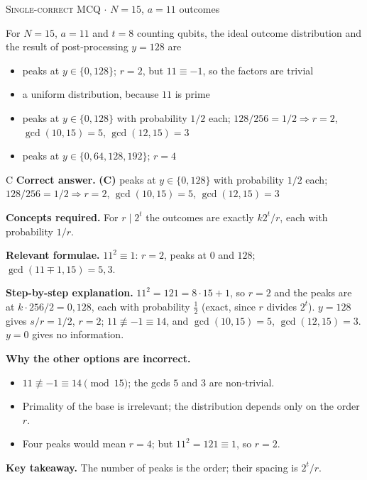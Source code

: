 \documentclass[11pt,a4paper]{article}
\newcommand{\optlabel}[1]{\textbf{(#1)}}
\newcommand{\correctlabel}[1]{\textcolor{okgreen}{\textbf{(#1)}\,\ding{51}}}
\newenvironment{qitem}[1]{\begin{list}{}{\setlength{\leftmargin}{3.3em}\setlength{\labelwidth}{3.1em}%
  \setlength{\labelsep}{0.2em}\setlength{\topsep}{3pt}\setlength{\parsep}{3pt}}\item[\textbf{Q.#1}\hfill]}{\end{list}}
\newcommand{\qsep}{\par\vspace{2pt}{\color{black!15}\hrule}\vspace{4pt}}
\newcommand{\qmeta}[2]{{\footnotesize\color{black!60}\textsc{#1} \;$\cdot$\; #2}\par}
\begin{document}
\begin{qitem}{47}
\qmeta{Single-correct MCQ}{$N = 15$, $a = 11$ outcomes}
For $N = 15$, $a = 11$ and $t = 8$ counting qubits, the ideal outcome distribution and the result of post-processing $y = 128$ are
\begin{itemize}[leftmargin=2.6em, labelsep=0.4em, itemsep=2pt, topsep=3pt]
\item[\optlabel{A}] peaks at $y \in \{0, 128\}$; $r = 2$, but $11 \equiv -1$, so the factors are trivial
\item[\optlabel{B}] a uniform distribution, because $11$ is prime
\item[\correctlabel{C}] peaks at $y \in \{0, 128\}$ with probability $1/2$ each; $128/256 = 1/2 \Rightarrow r = 2$, $\gcd(10, 15) = 5$, $\gcd(12, 15) = 3$
\item[\optlabel{D}] peaks at $y \in \{0, 64, 128, 192\}$; $r = 4$
\end{itemize}
\end{qitem}
\begin{solbox}{C}
\textbf{\color{brand}Correct answer.} \textcolor{okgreen}{\textbf{(C)}} peaks at $y \in \{0, 128\}$ with probability $1/2$ each; $128/256 = 1/2 \Rightarrow r = 2$, $\gcd(10, 15) = 5$, $\gcd(12, 15) = 3$

\textbf{\color{brand}Concepts required.} For $r \mid 2^t$ the outcomes are exactly $k2^t/r$, each with probability $1/r$.

\textbf{\color{brand}Relevant formulae.} $11^2 \equiv 1$: $r = 2$, peaks at $0$ and $128$; $\gcd(11 \mp 1, 15) = 5, 3$.

\textbf{\color{brand}Step-by-step explanation.} $11^2 = 121 = 8\cdot15 + 1$, so $r = 2$ and the peaks are at $k\cdot256/2 = 0, 128$, each with probability $\frac12$ (exact, since $r$ divides $2^t$). $y = 128$
gives $s/r = 1/2$, $r = 2$; $11 \not\equiv -1 \equiv 14$, and $\gcd(10, 15) = 5$, $\gcd(12, 15) = 3$. $y = 0$ gives no information.

\textbf{\color{brand}Why the other options are incorrect.}
\begin{itemize}[leftmargin=2.4em, itemsep=1pt, topsep=2pt]
\item[\textbf{(A)}] $11 \not\equiv -1 \equiv 14 \pmod{15}$; the gcds $5$ and $3$ are non-trivial.
\item[\textbf{(B)}] Primality of the base is irrelevant; the distribution depends only on the order $r$.
\item[\textbf{(D)}] Four peaks would mean $r = 4$; but $11^2 = 121 \equiv 1$, so $r = 2$.
\end{itemize}
\textbf{\color{brand}Key takeaway.} The number of peaks is the order; their spacing is $2^t/r$.
\end{solbox}
\qsep
\end{document}
